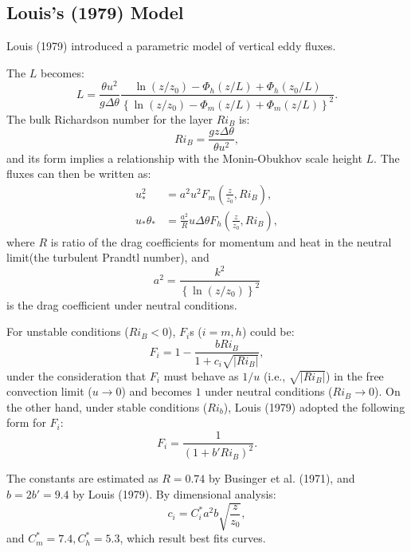 \subsection{Louis’s (1979) Model}
Louis (1979) introduced a parametric model of vertical eddy fluxes.

The $L$ becomes:
\begin{equation}
  L = \frac{\theta u^2}{g\Delta\theta}
    \frac{\ln(z/z_0)-\Phi_h(z/L)+\Phi_h(z_0/L)}{\left\{\ln(z/z_0)-\Phi_m(z/L)+\Phi_m(z/L)\right\}^2}.
\end{equation}
The bulk Richardson number for the layer $Ri_B$ is:
\begin{equation}
  Ri_B = \frac{gz\Delta\theta}{\theta u^2},
\end{equation}
and its form implies a relationship with the Monin-Obukhov scale height $L$.
The fluxes can then be written as:
\begin{align}
  u_*^2 &= a^2 u^2 F_m\left(\frac{z}{z_0},Ri_B\right), \label{eq: u_*^2} \\
  u_*\theta_* &= \frac{a^2}{R} u \Delta \theta F_h\left(\frac{z}{z_0},Ri_B\right), \label{eq: u_*t_*}
\end{align}
where
$R$ is ratio of the drag coefficients for momentum and heat in the neutral limit(the turbulent Prandtl number),
and
\begin{equation}
  a^2 = \frac{k^2}{\left\{\ln\left(z/z_0\right)\right\}^2}
\end{equation}
is the drag coefficient under neutral conditions.

For unstable conditions ($Ri_B<0$),
$F_i$s ($i=m,h$) could be:
\begin{equation}
  F_i = 1 - \frac{b Ri_B}{1 + c_i \sqrt{|Ri_B|}},
  \label{eq: F_i unstable}
\end{equation}
under the consideration that
$F_i$ must behave as $1/u$ (i.e., $\sqrt{|Ri_B|}$) in the free convection limit ($u \to 0$) and becomes $1$ under neutral conditions ($Ri_B \to 0$).
On the other hand, under stable conditions ($Ri_b$), Louis (1979) adopted the following form for $F_i$:
\begin{equation}
  F_i = \frac{1}{(1 + b' Ri_B)^2}.
  \label{eq: F_i stable}
\end{equation}

The constants are estimated as $R=0.74$ by Businger et al. (1971),
and $b=2b'=9.4$ by Louis (1979).
By dimensional analysis:
\begin{equation}
  c_i = C^*_i a^2 b \sqrt{\frac{z}{z_0}},
\end{equation}
and $C^*_m = 7.4, C^*_h = 5.3$, which result best fits curves.


